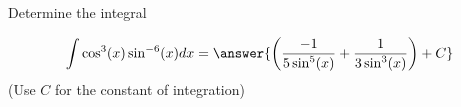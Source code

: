 \documentclass{ximera}
\author{Jason Miller}
\begin{document}
\begin{exercise}
Determine the integral

\[
\int \cos^{3}(x)\sin^{-6}(x) dx= \answer{ \left(    \frac{-1}{5\sin^{5}(x)} + \frac{1}{3 \sin^{3}(x)}  \right) +C} 
\]
(Use $C$ for the constant of integration)

\end{exercise}
\end{document}
